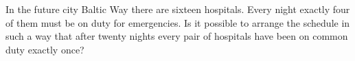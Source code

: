 In the future city Baltic Way there are sixteen hospitals. Every night exactly four of them must be on duty for emergencies. Is it possible to arrange the schedule in such a way that after twenty nights every pair of hospitals have been on common duty exactly once?